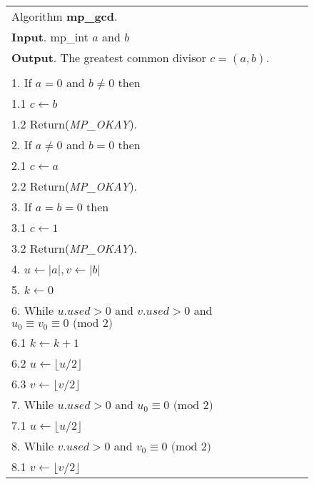 \documentclass[b5paper]{book}
\begin{document}
\newpage\begin{figure}[!here]
\begin{small}
\begin{center}
\begin{tabular}{l}
\hline Algorithm \textbf{mp\_gcd}. \\
\textbf{Input}.   mp\_int $a$ and $b$ \\
\textbf{Output}.  The greatest common divisor $c = (a, b)$.  \\
\hline \\
1.  If $a = 0$ and $b \ne 0$ then \\
\hspace{3mm}1.1  $c \leftarrow b$ \\
\hspace{3mm}1.2  Return(\textit{MP\_OKAY}). \\
2.  If $a \ne 0$ and $b = 0$ then \\
\hspace{3mm}2.1  $c \leftarrow a$ \\
\hspace{3mm}2.2  Return(\textit{MP\_OKAY}). \\
3.  If $a = b = 0$ then \\
\hspace{3mm}3.1  $c \leftarrow 1$ \\
\hspace{3mm}3.2  Return(\textit{MP\_OKAY}). \\
4.  $u \leftarrow \vert a \vert, v \leftarrow \vert b \vert$ \\
5.  $k \leftarrow 0$ \\
6.  While $u.used > 0$ and $v.used > 0$ and $u_0 \equiv v_0 \equiv 0 \mbox{ (mod }2\mbox{)}$ \\
\hspace{3mm}6.1  $k \leftarrow k + 1$ \\
\hspace{3mm}6.2  $u \leftarrow \lfloor u / 2 \rfloor$ \\
\hspace{3mm}6.3  $v \leftarrow \lfloor v / 2 \rfloor$ \\
7.  While $u.used > 0$ and $u_0 \equiv 0 \mbox{ (mod }2\mbox{)}$ \\
\hspace{3mm}7.1  $u \leftarrow \lfloor u / 2 \rfloor$ \\
8.  While $v.used > 0$ and $v_0 \equiv 0 \mbox{ (mod }2\mbox{)}$ \\
\hspace{3mm}8.1  $v \leftarrow \lfloor v / 2 \rfloor$ \\

\end{tabular}
\end{center}
\end{small}
\end{figure}
\end{document}
